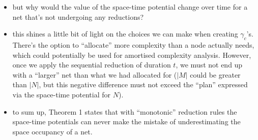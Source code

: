 \documentclass{fit-teorsem}
\begin{document}
\begin{itemize}
		\begin{itemize}
			\item but why would the value of the space-time potential change over time for a net that's not
				undergoing any reductions?
			\item this shines a little bit of light on the choices we can make when creating $\gamma_c$'s.
				There's the option to ``allocate'' more complexity than a node actually needs,
				which could potentially be used for amortised complexity analysis. However, once
				we apply the sequential reduction of duration $t$, we must not end up with a ``larger''
				net than what we had allocated for ($|M|$ could be greater than $|N|$, but this negative
				difference must not exceed the ``plan'' expressed via the space-time potential for $N$).
			\item to sum up, Theorem 1 states that with ``monotonic'' reduction rules the space-time
				potentials can never make the mistake of underestimating the space occupancy of a net.
		\end{itemize}


\end{itemize}
\end{document}

